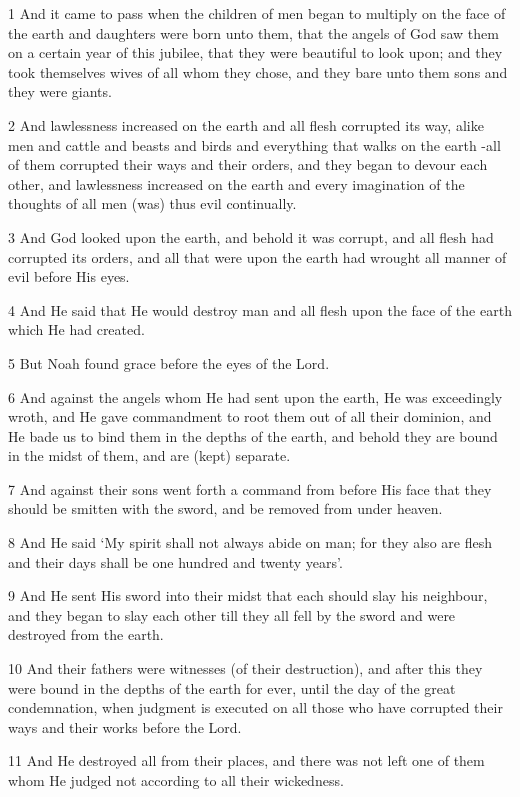 \par 1 And it came to pass when the children of men began to multiply on the face of the earth and daughters were born unto them, that the angels of God saw them on a certain year of this jubilee, that they were beautiful to look upon; and they took themselves wives of all whom they chose, and they bare unto them sons and they were giants.
\par 2 And lawlessness increased on the earth and all flesh corrupted its way, alike men and cattle and beasts and birds and everything that walks on the earth -all of them corrupted their ways and their orders, and they began to devour each other, and lawlessness increased on the earth and every imagination of the thoughts of all men (was) thus evil continually.
\par 3 And God looked upon the earth, and behold it was corrupt, and all flesh had corrupted its orders, and all that were upon the earth had wrought all manner of evil before His eyes.
\par 4 And He said that He would destroy man and all flesh upon the face of the earth which He had created.
\par 5 But Noah found grace before the eyes of the Lord.
\par 6 And against the angels whom He had sent upon the earth, He was exceedingly wroth, and He gave commandment to root them out of all their dominion, and He bade us to bind them in the depths of the earth, and behold they are bound in the midst of them, and are (kept) separate.
\par 7 And against their sons went forth a command from before His face that they should be smitten with the sword, and be removed from under heaven.
\par 8 And He said ‘My spirit shall not always abide on man; for they also are flesh and their days shall be one hundred and twenty years’.
\par 9 And He sent His sword into their midst that each should slay his neighbour, and they began to slay each other till they all fell by the sword and were destroyed from the earth.
\par 10 And their fathers were witnesses (of their destruction), and after this they were bound in the depths of the earth for ever, until the day of the great condemnation, when judgment is executed on all those who have corrupted their ways and their works before the Lord.
\par 11 And He destroyed all from their places, and there was not left one of them whom He judged not according to all their wickedness.
